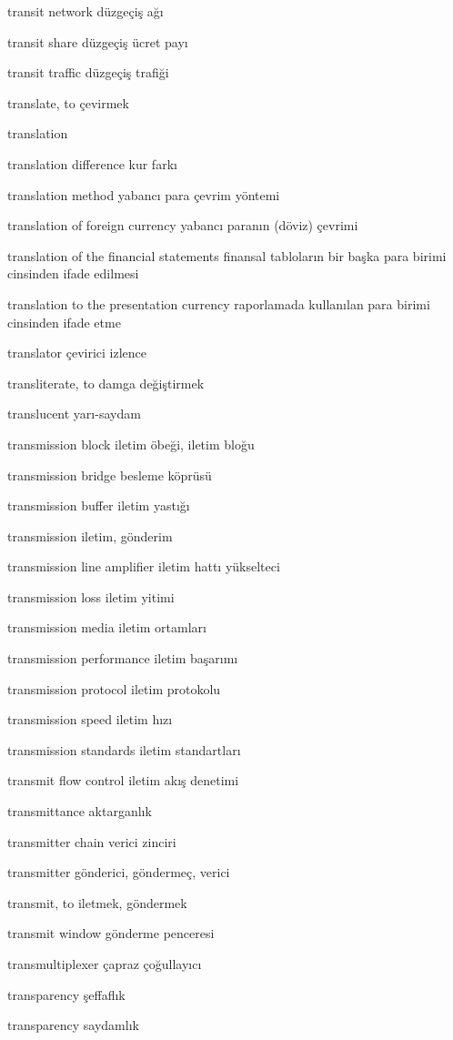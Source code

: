 \documentclass[12pt,fleqn]{article}\usepackage{../../common}
\begin{document}
transit network düzgeçiş ağı

transit share düzgeçiş ücret payı

transit traffic düzgeçiş trafiği

translate, to çevirmek

translation

translation difference kur farkı

translation method yabancı para çevrim yöntemi

translation of foreign currency yabancı paranın (döviz) çevrimi

translation of the financial statements finansal tabloların bir başka para birimi cinsinden ifade edilmesi

translation to the presentation currency raporlamada kullanılan para birimi cinsinden ifade etme

translator çevirici izlence

transliterate, to damga değiştirmek

translucent yarı-saydam

transmission block iletim öbeği, iletim bloğu

transmission bridge besleme köprüsü

transmission buffer iletim yastığı

transmission iletim, gönderim

transmission line amplifier iletim hattı yükselteci

transmission loss iletim yitimi

transmission media iletim ortamları

transmission performance iletim başarımı

transmission protocol iletim protokolu

transmission speed iletim hızı

transmission standards iletim standartları

transmit flow control iletim akış denetimi

transmittance aktarganlık

transmitter chain verici zinciri

transmitter gönderici, göndermeç, verici

transmit, to iletmek, göndermek

transmit window gönderme penceresi

transmultiplexer çapraz çoğullayıcı

transparency şeffaflık

transparency saydamlık
\end{document}
